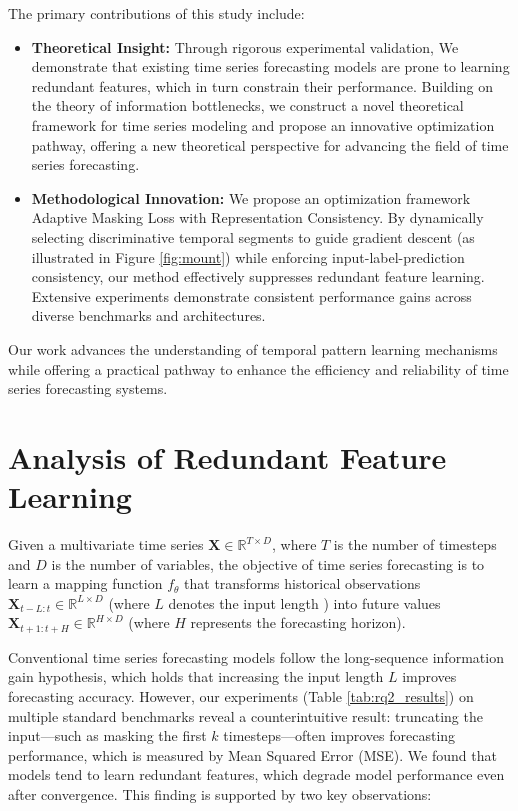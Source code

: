 \documentclass{article}
\begin{document}
The primary contributions of this study include:
\begin{itemize}[leftmargin=*, itemsep=0pt, topsep=1pt]
    \item \textbf{Theoretical Insight:} Through rigorous experimental validation, We demonstrate that existing time series forecasting models are prone to learning redundant features, which in turn constrain their performance. Building on the theory of information bottlenecks, we construct a novel theoretical framework for time series modeling and propose an innovative optimization pathway, offering a new theoretical perspective for advancing the field of time series forecasting.
    \item \textbf{Methodological Innovation:} We propose an optimization framework  Adaptive Masking Loss with Representation Consistency. By dynamically selecting discriminative temporal segments to guide gradient descent (as illustrated in Figure \ref{fig:mount}) while enforcing input-label-prediction consistency, our method effectively suppresses redundant feature learning. Extensive experiments demonstrate consistent performance gains across diverse benchmarks and architectures.
\end{itemize}
Our work advances the understanding of temporal pattern learning mechanisms while offering a practical pathway to enhance the efficiency and reliability of time series forecasting systems.
\vspace{-1.5mm}
\section{Analysis of Redundant Feature Learning }
\label{Analysis}
Given a multivariate time series \( \mathbf{X} \in \mathbb{R}^{T \times D} \), where \( T \) is the number of timesteps and \( D \) is the number of variables, the objective of time series forecasting is to learn a mapping function \( f_{\theta} \) that transforms historical observations \( \mathbf{X}_{t-L:t} \in \mathbb{R}^{L \times D} \) (where \( L \) denotes the input length ) into future values \( \mathbf{X}_{t+1:t+H} \in \mathbb{R}^{H \times D} \) (where \( H \) represents the forecasting horizon).

Conventional time series forecasting models follow the long-sequence information gain hypothesis\cite{transformerxl,informer,longnet,bigbird}, which holds that increasing the input length \( L \) improves forecasting accuracy. However, our experiments (Table \ref{tab:rq2_results}) on multiple standard benchmarks reveal a counterintuitive result: truncating the input—such as masking the first \( k \) timesteps—often improves forecasting performance, which is measured by Mean Squared Error (MSE).  We found that models tend to learn redundant features, which degrade model performance even after convergence. This finding is supported by two key observations:
\end{document}
